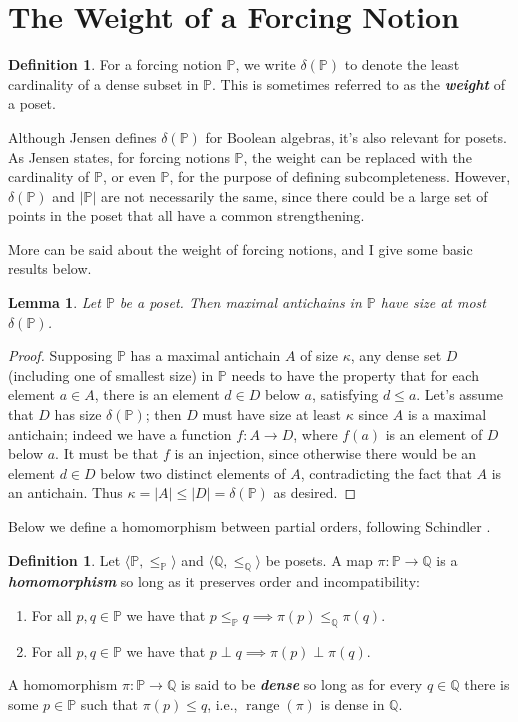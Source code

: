 \documentclass{amsart}
\newtheorem{lemma}[theorem]{Lemma}
\theoremstyle{definition}
\newtheorem{definition}[theorem]{Definition}
\theoremstyle{remark}
\renewcommand{\P}{\mathbb{P}}
\newcommand{\Q}{\mathbb{Q}}
\DeclareMathOperator{\ran}{range}
\begin{document}
\section{The Weight of a Forcing Notion}
\label{sec:delta}

\begin{definition} For a forcing notion $\P$, we write $\delta(\P)$ to denote the least cardinality of a dense subset in $\P$. This is sometimes referred to as the \textit{\textbf{weight}} of a poset. \end{definition}

Although Jensen defines $\delta(\P)$ for Boolean algebras, it's also relevant for posets. As Jensen states, for forcing notions $\P$, the weight can be replaced with the cardinality of $\P$, or even $\P$, for the purpose of defining subcompleteness. However, $\delta(\P)$ and $|\P|$ are not necessarily the same, since there could be a large set of points in the poset that all have a common strengthening. 

More can be said about the weight of forcing notions, and I give some basic results below.

\begin{lemma} Let $\P$ be a poset. Then maximal antichains in $\P$ have size at most $\delta(\P)$. \end{lemma}
\begin{proof}
Supposing $\P$ has a maximal antichain $A$ of size $\kappa$, any dense set $D$ (including one of smallest size) in $\P$ needs to have the property that for each element $a \in A$, there is an element $d \in D$ below $a$, satisfying $d \leq a$. Let's assume that $D$ has size $\delta(\P)$; then $D$ must have size at least $\kappa$ since $A$ is a maximal antichain; indeed we have a function $f:A \to D$, where $f(a)$ is an element of $D$ below $a$. It must be that $f$ is an injection, since otherwise there would be an element $d \in D$ below two distinct elements of $A$, contradicting the fact that $A$ is an antichain. Thus $\kappa =|A| \leq |D| = \delta(\P)$ as desired.
\end{proof}

Below we define a homomorphism between partial orders, following Schindler \cite[Definition 6.47]{schindler2014set}.

\begin{definition}  Let $\langle \P, \leq_\P \rangle$ and $\langle \Q, \leq_\Q \rangle$ be posets. A map $\pi: \P \to \Q$ is a \textbf{\emph{homomorphism}} so long as it preserves order and incompatibility: \begin{enumerate}
	\item For all $p,q \in \P$ we have that $p \leq_\P q \implies \pi(p) \leq_\Q \pi(q)$.
	\item For all $p,q \in \P$ we have that $p \perp q \implies \pi(p) \perp \pi(q)$.
\end{enumerate}

A homomorphism $\pi:\P \to \Q$ is said to be \textbf{\emph{dense}} so long as for every $q \in \Q$ there is some $p \in \P$ such that $\pi(p) \leq q$, i.e., $\ran(\pi)$ is dense in $\Q$. \end{definition}
\end{document}
